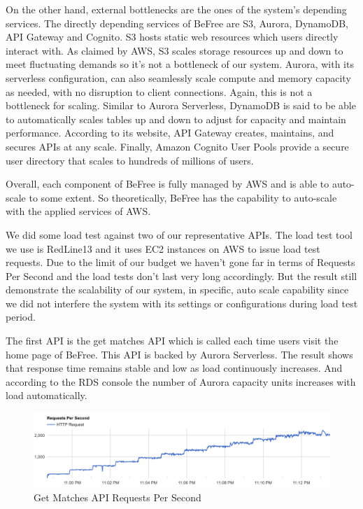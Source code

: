 \documentclass[conference]{IEEEtran}
\begin{document}
On the other hand, external bottlenecks are the ones of the system's depending services. The directly depending services of BeFree are S3, Aurora, DynamoDB, API Gateway and Cognito. S3 hosts static web resources which users directly interact with. As claimed by AWS, S3 scales storage resources up and down to meet fluctuating demands so it's not a bottleneck of our system. Aurora, with its serverless configuration, can also seamlessly scale compute and memory capacity as needed, with no disruption to client connections. Again, this is not a bottleneck for scaling. Similar to Aurora Serverless, DynamoDB is said to be able to automatically scales tables up and down to adjust for capacity and maintain performance. According to its website, API Gateway creates, maintains, and secures APIs at any scale. Finally, Amazon Cognito User Pools provide a secure user directory that scales to hundreds of millions of users.

Overall, each component of BeFree is fully managed by AWS and is able to auto-scale to some extent. So theoretically, BeFree has the capability to auto-scale with the applied services of AWS.

We did some load test against two of our representative APIs. The load test tool we use is RedLine13 \cite{b19} and it uses EC2 instances on AWS to issue load test requests. Due to the limit of our budget we haven't gone far in terms of Requests Per Second and the load tests don't last very long accordingly. But the result still demonstrate the scalability of our system, in specific, auto scale capability since we did not interfere the system with its settings or configurations during load test period.

The first API is the get matches API which is called each time users visit the home page of BeFree. This API is backed by Aurora Serverless. The result shows that response time remains stable and low as load continuously increases. And according to the RDS console the number of Aurora capacity units increases with load automatically.

\begin{figure}[htbp]
 \centerline{\includegraphics[scale=0.26]{matches-qps.png}}
\caption{Get Matches API Requests Per Second}
\end{figure}
\end{document}
